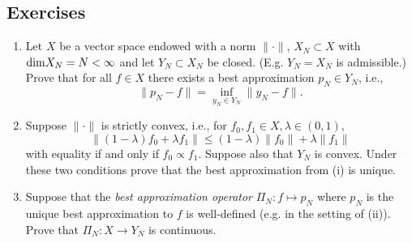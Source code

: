 \subsection{Exercises}

\begin{exercise}
  \label{exr:prelims:bestapprox}
  \begin{enumerate} \ilist
  \item Let $X$ be a vector space endowed with a norm $\|\cdot\|$,
  $X_N \subset X$ with ${\rm dim} X_N = N < \infty$ and let
  $Y_N \subset X_N$ be closed. (E.g. $Y_N=X_N$ is admissible.)
  Prove that for all $f \in X$ there exists a best approximation
  $p_N \in Y_N$, i.e.,
  \[
    \| p_N - f \|  = \inf_{y_N \in Y_N} \|y_N - f\|.
  \]

  \item Suppose $\|\cdot\|$ is strictly convex, i.e., for $f_0, f_1 \in X, \lambda \in (0, 1)$,
  \[
    \| (1-\lambda) f_0 + \lambda f_1 \| \leq (1-\lambda) \|f_0\| + \lambda \|f_1 \|
  \]
  with equality if and only if $f_0 \propto f_1$. Suppose also that $Y_N$ is
  convex. Under these two conditions prove that the best approximation from (i)
  is unique.

  \item Suppose that the {\em best approximation operator}
    $\Pi_N : f \mapsto p_N$ where $p_N$ is the unique best approximation to $f$
    is well-defined (e.g. in the setting of (ii)). Prove that $\Pi_N : X \to
    Y_N$ is continuous.
  \end{enumerate}
\end{exercise}

